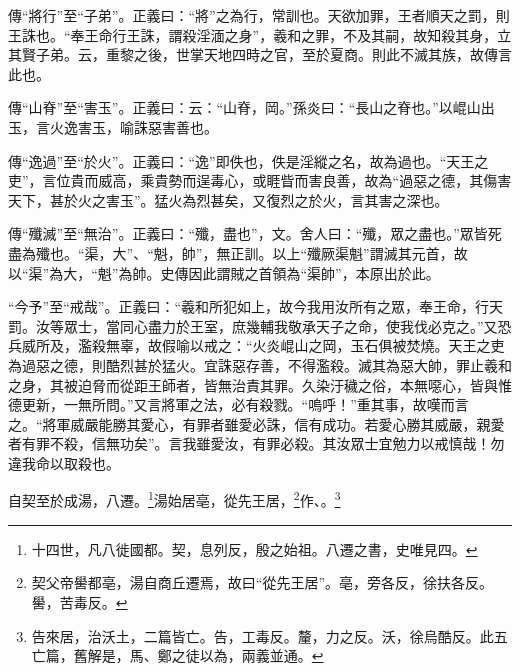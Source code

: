 {\noindent\zhuan{}\fzbyks 傳“將行”至“子弟”。正義曰：“將”之為行，常訓也。天欲加罪，王者順天之罰，則王誅也。“奉王命行王誅，謂殺淫湎之身”，羲和之罪，不及其嗣，故知殺其身，立其賢子弟。云，重黎之後，世掌天地四時之官，至於夏商。則此不滅其族，故傳言此也。 \par}

{\noindent\zhuan{}\fzbyks 傳“山脊”至“害玉”。正義曰：云：“山脊，岡。”孫炎曰：“長山之脊也。”以崐山出玉，言火逸害玉，喻誅惡害善也。 \par}

{\noindent\zhuan{}\fzbyks 傳“逸過”至“於火”。正義曰：“逸”即佚也，佚是淫縱之名，故為過也。“天王之吏”，言位貴而威高，乘貴勢而逞毒心，或睚眥而害良善，故為“過惡之德，其傷害天下，甚於火之害玉”。猛火為烈甚矣，又復烈之於火，言其害之深也。 \par}

{\noindent\zhuan{}\fzbyks 傳“殲滅”至“無治”。正義曰：“殲，盡也”，文。舍人曰：“殲，眾之盡也。”眾皆死盡為殲也。“渠，大”、“魁，帥”，無正訓。以上“殲厥渠魁”謂滅其元首，故以“渠”為大，“魁”為帥。史傳因此謂賊之首領為“渠帥”，本原出於此。 \par}

{\noindent\shu{}\fzkt “今予”至“戒哉”。正義曰：“羲和所犯如上，故今我用汝所有之眾，奉王命，行天罰。汝等眾士，當同心盡力於王室，庶幾輔我敬承天子之命，使我伐必克之。”又恐兵威所及，濫殺無辜，故假喻以戒之：“火炎崐山之岡，玉石俱被焚燒。天王之吏為過惡之德，則酷烈甚於猛火。宜誅惡存善，不得濫殺。滅其為惡大帥，罪止羲和之身，其被迫脅而從距王師者，皆無治責其罪。久染汙穢之俗，本無噁心，皆與惟德更新，一無所問。”又言將軍之法，必有殺戮。“嗚呼！”重其事，故嘆而言之。“將軍威嚴能勝其愛心，有罪者雖愛必誅，信有成功。若愛心勝其威嚴，親愛者有罪不殺，信無功矣”。言我雖愛汝，有罪必殺。其汝眾士宜勉力以戒慎哉！勿違我命以取殺也。 \par}

自契至於成湯，八遷。\footnote{十四世，凡八徙國都。契，息列反，殷之始祖。八遷之書，史唯見四。}湯始居亳，從先王居，\footnote{契父帝嚳都亳，湯自商丘遷焉，故曰“從先王居”。亳，旁各反，徐扶各反。嚳，苦毒反。}作、。\footnote{告來居，治沃土，二篇皆亡。告，工毒反。釐，力之反。沃，徐烏酷反。此五亡篇，舊解是，馬、鄭之徒以為，兩義並通。}


